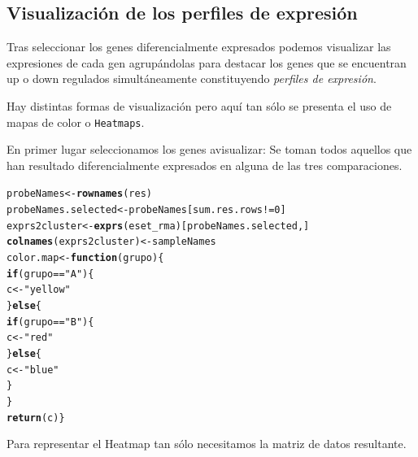 \documentclass[a4paper]{article}\usepackage[]{graphicx}\usepackage[]{color}
\makeatletter
\newcommand{\hlnum}[1]{\textcolor[rgb]{0.686,0.059,0.569}{#1}}%
\newcommand{\hlstr}[1]{\textcolor[rgb]{0.192,0.494,0.8}{#1}}%
\newcommand{\hlopt}[1]{\textcolor[rgb]{0,0,0}{#1}}%
\newcommand{\hlstd}[1]{\textcolor[rgb]{0.345,0.345,0.345}{#1}}%
\newcommand{\hlkwa}[1]{\textcolor[rgb]{0.161,0.373,0.58}{\textbf{#1}}}%
\newcommand{\hlkwb}[1]{\textcolor[rgb]{0.69,0.353,0.396}{#1}}%
\newcommand{\hlkwc}[1]{\textcolor[rgb]{0.333,0.667,0.333}{#1}}%
\newcommand{\hlkwd}[1]{\textcolor[rgb]{0.737,0.353,0.396}{\textbf{#1}}}%
\newenvironment{kframe}{%
 \def\at@end@of@kframe{}%
 \ifinner\ifhmode%
  \def\at@end@of@kframe{\end{minipage}}%
  \begin{minipage}{\columnwidth}%
 \fi\fi%
 \def\FrameCommand##1{\hskip\@totalleftmargin \hskip-\fboxsep
 \colorbox{shadecolor}{##1}\hskip-\fboxsep
     \hskip-\linewidth \hskip-\@totalleftmargin \hskip\columnwidth}%
 \MakeFramed {\advance\hsize-\width
   \@totalleftmargin\z@ \linewidth\hsize
   \@setminipage}}%
 {\par\unskip\endMakeFramed%
 \at@end@of@kframe}
\newenvironment{knitrout}{}{} %
\makeatother
\begin{document}
\subsection{Visualización de los perfiles de expresión}

Tras seleccionar los genes diferencialmente expresados podemos visualizar 
las expresiones de cada gen agrupándolas para destacar los genes que se 
encuentran up o down regulados simultáneamente constituyendo \emph{perfiles de expresión}.

Hay distintas formas de visualización pero aquí tan sólo se presenta el uso de mapas de color o 
\texttt{Heatmaps}.

En primer lugar seleccionamos los genes avisualizar: Se toman todos aquellos que 
han resultado diferencialmente expresados en alguna de las tres comparaciones.

\begin{knitrout}
\color{fgcolor}\begin{kframe}
\begin{alltt}
\hlstd{probeNames}\hlkwb{<-}\hlkwd{rownames}\hlstd{(res)}
\hlstd{probeNames.selected}\hlkwb{<-}\hlstd{probeNames[sum.res.rows}\hlopt{!=}\hlnum{0}\hlstd{]}
\hlstd{exprs2cluster} \hlkwb{<-}\hlkwd{exprs}\hlstd{(eset_rma)[probeNames.selected,]}
\hlkwd{colnames}\hlstd{(exprs2cluster)}\hlkwb{<-}\hlstd{sampleNames}
\hlstd{color.map} \hlkwb{<-} \hlkwa{function}\hlstd{(}\hlkwc{grupo}\hlstd{) \{}
  \hlkwa{if} \hlstd{(grupo}\hlopt{==}\hlstr{"A"}\hlstd{)\{}
    \hlstd{c}\hlkwb{<-} \hlstr{"yellow"}
  \hlstd{\}}\hlkwa{else}\hlstd{\{}
    \hlkwa{if} \hlstd{(grupo}\hlopt{==}\hlstr{"B"}\hlstd{)\{}
      \hlstd{c}\hlkwb{<-} \hlstr{"red"}
    \hlstd{\}}\hlkwa{else}\hlstd{\{}
      \hlstd{c}\hlkwb{<-} \hlstr{"blue"}
   \hlstd{\}}
  \hlstd{\}}
\hlkwd{return}\hlstd{(c)\}}
\end{alltt}
\end{kframe}
\end{knitrout}

Para representar el Heatmap tan sólo necesitamos la matriz de datos resultante.
\end{document}
